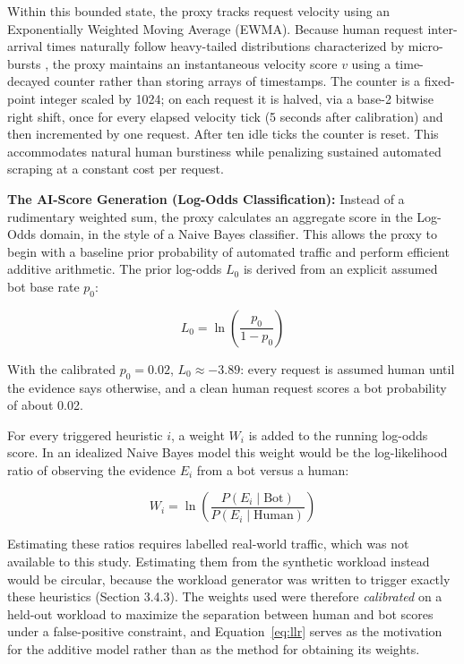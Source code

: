 Within this bounded state, the proxy tracks request velocity using an Exponentially Weighted Moving Average (EWMA). Because human request inter-arrival times naturally follow heavy-tailed distributions characterized by micro-bursts \cite{li_queuing_2018}, the proxy maintains an instantaneous velocity score $v$ using a time-decayed counter rather than storing arrays of timestamps. The counter is a fixed-point integer scaled by 1024; on each request it is halved, via a base-2 bitwise right shift, once for every elapsed velocity tick (5 seconds after calibration) and then incremented by one request. After ten idle ticks the counter is reset. This accommodates natural human burstiness while penalizing sustained automated scraping at a constant cost per request.

\textbf{The AI-Score Generation (Log-Odds Classification):}
Instead of a rudimentary weighted sum, the proxy calculates an aggregate score in the Log-Odds domain, in the style of a Naive Bayes classifier. This allows the proxy to begin with a baseline prior probability of automated traffic and perform efficient additive arithmetic. The prior log-odds $L_0$ is derived from an explicit assumed bot base rate $p_0$:

\begin{equation}
L_0 = \ln\left(\frac{p_0}{1 - p_0}\right)
\end{equation}

With the calibrated $p_0 = 0.02$, $L_0 \approx -3.89$: every request is assumed human until the evidence says otherwise, and a clean human request scores a bot probability of about 0.02.

For every triggered heuristic $i$, a weight $W_i$ is added to the running log-odds score. In an idealized Naive Bayes model this weight would be the log-likelihood ratio of observing the evidence $E_i$ from a bot versus a human:

\begin{equation}
W_i = \ln\left(\frac{P(E_i \mid \text{Bot})}{P(E_i \mid \text{Human})}\right)
\label{eq:llr}
\end{equation}

Estimating these ratios requires labelled real-world traffic, which was not available to this study. Estimating them from the synthetic workload instead would be circular, because the workload generator was written to trigger exactly these heuristics (Section 3.4.3). The weights used were therefore \emph{calibrated} on a held-out workload to maximize the separation between human and bot scores under a false-positive constraint, and Equation~\ref{eq:llr} serves as the motivation for the additive model rather than as the method for obtaining its weights.


